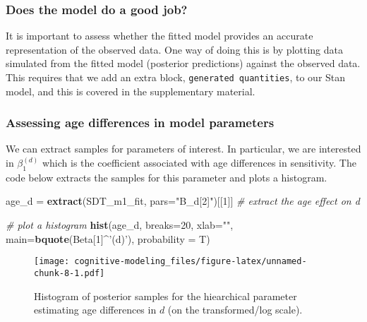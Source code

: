\documentclass[
  english,
  ,man,floatsintext]{apa6}
\newenvironment{Shaded}{\begin{snugshade}}{\end{snugshade}}
\newcommand{\CommentTok}[1]{\textcolor[rgb]{0.56,0.35,0.01}{\textit{#1}}}
\newcommand{\DataTypeTok}[1]{\textcolor[rgb]{0.13,0.29,0.53}{#1}}
\newcommand{\DecValTok}[1]{\textcolor[rgb]{0.00,0.00,0.81}{#1}}
\newcommand{\KeywordTok}[1]{\textcolor[rgb]{0.13,0.29,0.53}{\textbf{#1}}}
\newcommand{\NormalTok}[1]{#1}
\newcommand{\OperatorTok}[1]{\textcolor[rgb]{0.81,0.36,0.00}{\textbf{#1}}}
\newcommand{\StringTok}[1]{\textcolor[rgb]{0.31,0.60,0.02}{#1}}
\begin{document}
\hypertarget{does-the-model-do-a-good-job}{%
\subsubsection{Does the model do a good job?}\label{does-the-model-do-a-good-job}}

It is important to assess whether the fitted model provides an accurate representation of the observed data. One way of doing this is by plotting data simulated from the fitted model (posterior predictions) against the observed data. This requires that we add an extra block, \texttt{generated\ quantities}, to our Stan model, and this is covered in the supplementary material.

\hypertarget{assessing-age-differences-in-model-parameters}{%
\subsubsection{Assessing age differences in model parameters}\label{assessing-age-differences-in-model-parameters}}

We can extract samples for parameters of interest. In particular, we are interested in \(\beta^{(d)}_1\) which is the coefficient associated with age differences in sensitivity. The code below extracts the samples for this parameter and plots a histogram.

\begin{Shaded}
\begin{Highlighting}[]
\NormalTok{age_d =}\StringTok{ }\KeywordTok{extract}\NormalTok{(SDT_m1_fit, }\DataTypeTok{pars=}\StringTok{"B_d[2]"}\NormalTok{)[[}\DecValTok{1}\NormalTok{]] }\CommentTok{# extract the age effect on d}
\end{Highlighting}
\end{Shaded}

\begin{Shaded}
\begin{Highlighting}[]
\CommentTok{# plot a histogram}
\KeywordTok{hist}\NormalTok{(age_d, }\DataTypeTok{breaks=}\DecValTok{20}\NormalTok{, }\DataTypeTok{xlab=}\StringTok{""}\NormalTok{, }\DataTypeTok{main=}\KeywordTok{bquote}\NormalTok{(Beta[}\DecValTok{1}\NormalTok{]}\OperatorTok{^}\StringTok{'(d)'}\NormalTok{), }\DataTypeTok{probability =}\NormalTok{ T)}
\end{Highlighting}
\end{Shaded}

\begin{figure}
\centering
\texttt{[image: cognitive-modeling\_files/figure-latex/unnamed-chunk-8-1.pdf]}
\caption{\label{fig:unnamed-chunk-8}Histogram of posterior samples for the hiearchical parameter estimating age differences in \(d\) (on the transformed/log scale).}
\end{figure}
\end{document}
